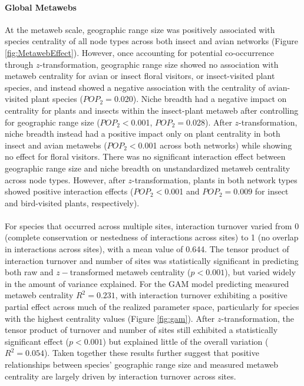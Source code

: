 \documentclass[12pt]{article}
\begin{document}
\paragraph*{Global Metawebs}
At the metaweb scale, geographic range size was positively associated with species centrality of all node types across both insect and avian networks (Figure \ref{fig:MetawebEffect}). However, once accounting for potential co-occurrence through $z$-transformation, geographic range size showed no association with metaweb centrality for avian or insect floral visitors, or insect-visited plant species, and instead showed a negative association with the centrality of avian-visited plant species ($POP_2=$0.020). Niche breadth had a negative impact on centrality for plants and insects within the insect-plant metaweb after controlling for geographic range size ($POP_2<$0.001, $POP_2=$0.028). After $z$-transformation, niche breadth instead had a positive impact only on plant centrality in both insect and avian metawebs ($POP_2<$0.001 across both networks) while showing no effect for floral visitors. There was no significant interaction effect between geographic range size and niche breadth on unstandardized metaweb centrality across node types. However, after $z$-transformation, plants in both network types showed positive interaction effects ($POP_2<$0.001 and $POP_2=0.009$ for insect and bird-visited plants, respectively).



\paragraph{} For species that occurred across multiple sites, interaction turnover varied from 0 (complete conservation or nestedness of interactions across sites) to 1 (no overlap in interactions across sites), with a mean value of 0.644. The tensor product of interaction turnover and number of sites was statistically significant in predicting both raw and $z-$transformed metaweb centrality ($p<0.001$), but varied widely in the amount of variance explained. For the GAM model predicting measured metaweb centrality $R^2=0.231$, with interaction turnover exhibiting a positive partial effect across much of the realized parameter space, particularly for species with the highest centrality values (Figure \ref{fig:gam}). After $z$-transformation, the tensor product of turnover and number of sites still exhibited a statistically significant effect ($p<0.001$) but explained little of the overall variation ($R^2=0.054$). Taken together these results further suggest that positive relationships between species' geographic range size and measured metaweb centrality are largely driven by interaction turnover across sites. 
\end{document}
